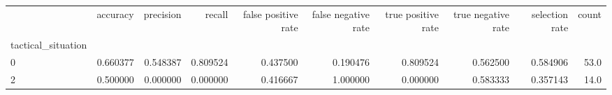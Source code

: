 \begin{tabular}{lrrrrrrrrr}
\toprule
{} &  accuracy &  precision &    recall &  false positive rate &  false negative rate &  true positive rate &  true negative rate &  selection rate &  count \\
tactical\_situation &           &            &           &                      &                      &                     &                     &                 &        \\
\midrule
0                  &  0.660377 &   0.548387 &  0.809524 &             0.437500 &             0.190476 &            0.809524 &            0.562500 &        0.584906 &   53.0 \\
2                  &  0.500000 &   0.000000 &  0.000000 &             0.416667 &             1.000000 &            0.000000 &            0.583333 &        0.357143 &   14.0 \\
\bottomrule
\end{tabular}
